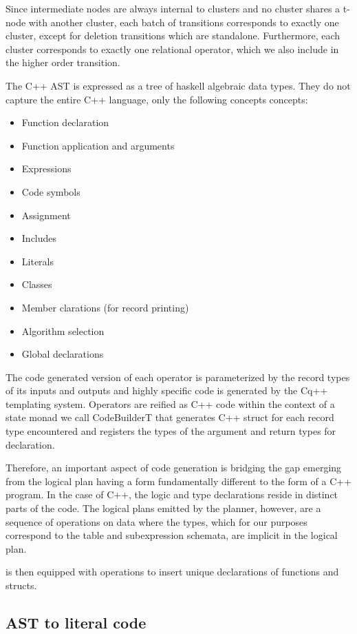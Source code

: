 Since intermediate nodes are always internal to clusters and no
cluster shares a t-node with another cluster, each batch of
transitions corresponds to exactly one cluster, except for deletion
transitions which are standalone. Furthermore, each cluster
corresponds to exactly one relational operator, which we also include
in the higher order transition.


The C++ AST is expressed as a tree of haskell algebraic data
types. They do not capture the entire C++ language, only the following
concepts concepts:

\begin{itemize}
\item Function declaration
\item Function application and arguments
\item Expressions
\item Code symbols
\item Assignment
\item Includes
\item Literals
\item Classes
\item Member clarations (for record printing)
\item Algorithm selection
\item Global declarations
\end{itemize}

The code generated version of each operator is parameterized by the
record types of its inputs and outputs and highly specific code is
generated by the Cq++ templating system. Operators are reified as C++
code within the context of a state monad we call CodeBuilderT that
generates C++ struct for each record type encountered and registers
the types of the argument and return types for declaration.

Therefore, an important aspect of code generation is bridging the gap
emerging from the logical plan having a form fundamentally different
to the form of a C++ program. In the case of C++, the logic and type
declarations reside in distinct parts of the code. The logical plans
emitted by the planner, however, are a sequence of operations on data
where the types, which for our purposes correspond to the table and
subexpression schemata, are implicit in the logical plan.

 is then equipped with operations to insert unique
declarations of functions and structs.

\subsection{AST to literal code}

